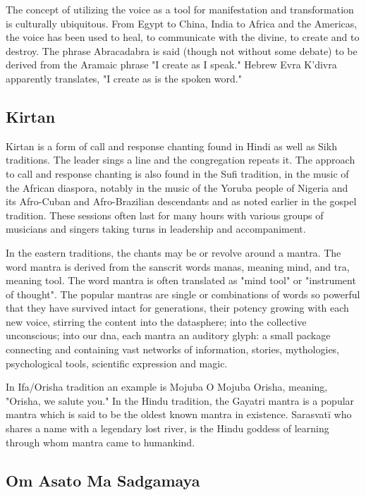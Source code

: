 \documentclass[12pt]{article}
\begin{document}
The concept of utilizing the voice as a tool for manifestation and transformation is culturally ubiquitous. From Egypt to China, India to Africa and the Americas, the voice has been used to heal, to communicate with the divine, to create and to destroy. The phrase Abracadabra is said (though not without some debate) to be derived from the Aramaic phrase "I create as I speak." Hebrew Evra K'divra apparently translates, "I create as is the spoken word."

\subsection*{Kirtan}

Kirtan is a form of call and response chanting found in Hindi as well as Sikh traditions. The leader sings a line and the congregation repeats it. The approach to call and response chanting is also found in the Sufi tradition, in the music of the African diaspora, notably in the music of the Yoruba people of Nigeria and its Afro-Cuban and Afro-Brazilian descendants and as noted earlier in the gospel tradition. These sessions often last for many hours with various groups of musicians and singers taking turns in leadership and accompaniment.

In the eastern traditions, the chants may be or revolve around a mantra. The word mantra is derived from the sanscrit words manas, meaning mind, and tra, meaning tool. The word mantra is often translated as "mind tool" or "instrument of thought". The popular mantras are single or combinations of words so powerful that they have survived intact for generations, their potency growing with each new voice, stirring the content into the datasphere; into the collective unconscious; into our dna, each mantra an auditory glyph: a small package connecting and containing vast networks of information, stories, mythologies, psychological tools, scientific expression and magic.

In Ifa/Orisha tradition an example is Mojuba O Mojuba Orisha, meaning, "Orisha, we salute you." In the Hindu tradition, the Gayatri mantra is a popular mantra which is said to be the oldest known mantra in existence. Sarasvatī who shares a name with a legendary lost river, is the Hindu goddess of learning through whom mantra came to humankind.

\subsection*{Om Asato Ma Sadgamaya}
\end{document}
